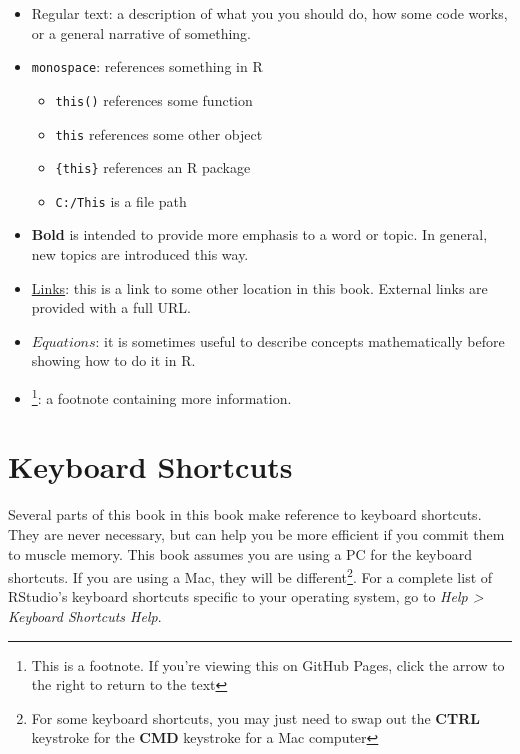 \documentclass[]{book}
\providecommand{\tightlist}{%
  \setlength{\itemsep}{0pt}\setlength{\parskip}{0pt}}
\let\rmarkdownfootnote\footnote%
\def\footnote{\protect\rmarkdownfootnote}
\begin{document}
\begin{itemize}
\tightlist
\item
  Regular text: a description of what you you should do, how some code works, or a general narrative of something.
\item
  \texttt{monospace}: references something in R

  \begin{itemize}
  \tightlist
  \item
    \texttt{this()} references some function
  \item
    \texttt{this} references some other object
  \item
    \texttt{\{this\}} references an R package
  \item
    \texttt{C:/This} is a file path
  \end{itemize}
\item
  \textbf{Bold} is intended to provide more emphasis to a word or topic. In general, new topics are introduced this way.
\item
  \protect\hyperlink{notation}{Links}: this is a link to some other location in this book. External links are provided with a full URL.
\item
  \(Equations\): it is sometimes useful to describe concepts mathematically before showing how to do it in R.
\item
  \footnote{This is a footnote. If you're viewing this on GitHub Pages, click the arrow to the right to return to the text}: a footnote containing more information.
\end{itemize}

\hypertarget{keyboard-shortcuts}{%
\section*{Keyboard Shortcuts}\label{keyboard-shortcuts}}

Several parts of this book in this book make reference to keyboard shortcuts. They are never necessary, but can help you be more efficient if you commit them to muscle memory. This book assumes you are using a PC for the keyboard shortcuts. If you are using a Mac, they will be different\footnote{For some keyboard shortcuts, you may just need to swap out the \textbf{CTRL} keystroke for the \textbf{CMD} keystroke for a Mac computer}. For a complete list of RStudio's keyboard shortcuts specific to your operating system, go to \emph{Help \textgreater{} Keyboard Shortcuts Help}.
\end{document}
